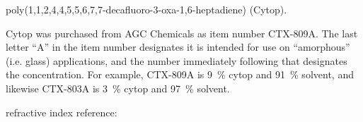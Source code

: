 poly(1,1,2,4,4,5,5,6,7,7-decafluoro-3-oxa-1,6-heptadiene) (Cytop).

Cytop was purchased from AGC Chemicals as item number CTX-809A.  The last
letter ``A'' in the item number designates it is intended for use on
``amorphous'' (i.e. glass) applications, and the number immediately
following that designates the concentration.  For example, CTX-809A is
\SI{9}{\percent} cytop and \SI{91}{\percent} solvent, and likewise CTX-803A
is \SI{3}{\percent} cytop and \SI{97}{\percent} solvent.

refractive index reference: \cite{mikevs2005synthesis}

